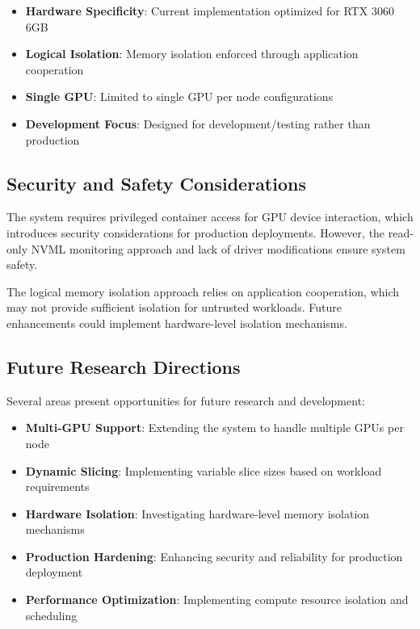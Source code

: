 \documentclass[10pt,twocolumn,letterpaper]{article}
\begin{document}
\begin{itemize}
\item \textbf{Hardware Specificity}: Current implementation optimized for RTX 3060 6GB
\item \textbf{Logical Isolation}: Memory isolation enforced through application cooperation
\item \textbf{Single GPU}: Limited to single GPU per node configurations
\item \textbf{Development Focus}: Designed for development/testing rather than production
\end{itemize}

\subsection{Security and Safety Considerations}

The system requires privileged container access for GPU device interaction, which introduces security considerations for production deployments. However, the read-only NVML monitoring approach and lack of driver modifications ensure system safety.

The logical memory isolation approach relies on application cooperation, which may not provide sufficient isolation for untrusted workloads. Future enhancements could implement hardware-level isolation mechanisms.

\subsection{Future Research Directions}

Several areas present opportunities for future research and development:

\begin{itemize}
\item \textbf{Multi-GPU Support}: Extending the system to handle multiple GPUs per node
\item \textbf{Dynamic Slicing}: Implementing variable slice sizes based on workload requirements
\item \textbf{Hardware Isolation}: Investigating hardware-level memory isolation mechanisms
\item \textbf{Production Hardening}: Enhancing security and reliability for production deployment
\item \textbf{Performance Optimization}: Implementing compute resource isolation and scheduling
\end{itemize}
\end{document}
